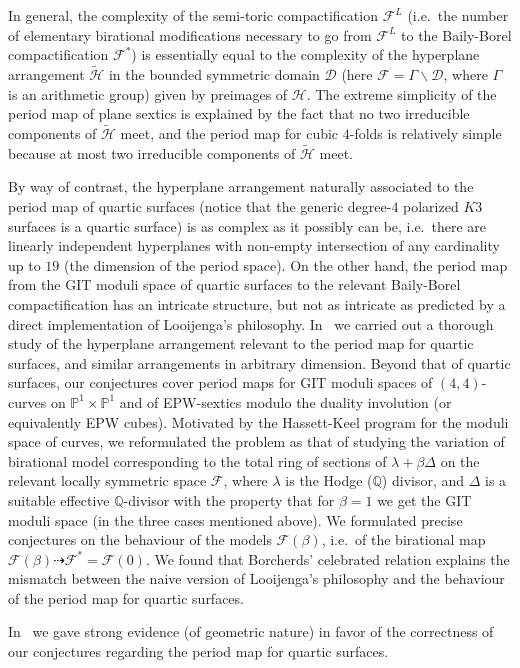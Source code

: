 \documentclass[11pt]{amsart}
\numberwithin{equation}{section}
\theoremstyle{plain}
\theoremstyle{remark}
\theoremstyle{definition}
\newcommand{\sF}{\mathscr{F}}
\newcommand{\sH}{\mathscr{H}}
\newcommand{\sD}{\mathscr{D}}
\newcommand{\dra}{\dashrightarrow}
\newcommand{\PP}{{\mathbb P}}
\newcommand{\QQ}{{\mathbb Q}}
\newcommand{\wt}{\widetilde}
\begin{document}
 In general, the complexity of the semi-toric compactification $\sF^L$ (i.e.~the number of elementary birational modifications necessary to go from
  $\sF^{L}$ to the Baily-Borel compactification $\sF^{*}$) is essentially equal to the complexity of the  hyperplane arrangement $\wt{\sH}$ in the bounded symmetric domain $\sD$ (here $\sF=\Gamma\backslash\sD$, where $\Gamma$ is an arithmetic group)   given by preimages of $\sH$. The extreme simplicity of the period map of plane sextics is explained by the fact that no two irreducible components of $\wt{\sH}$ meet, and the period map for cubic $4$-folds is relatively simple because  at most two irreducible components of $\wt{\sH}$ meet. 
 
 By way of contrast, the hyperplane arrangement  naturally associated to the period map  of quartic surfaces (notice that the generic degree-$4$ polarized $K3$ surfaces is a quartic surface) is as complex as it possibly can be, i.e.~there are linearly independent hyperplanes with non-empty intersection of any cardinality up to $19$ (the dimension of the period space).
On the other hand, the period map from the GIT moduli space of quartic surfaces  to the relevant Baily-Borel compactification has an intricate structure, but not as intricate as predicted by a direct implementation of Looijenga's philosophy.
In~\cite{log1} we carried out a thorough study of the hyperplane arrangement relevant to the period map for quartic surfaces, and similar arrangements in arbitrary dimension. Beyond that of quartic surfaces, our conjectures cover period maps for GIT moduli spaces  of $(4,4)$-curves on $\PP^1\times\PP^1$ and of EPW-sextics modulo the duality involution (or equivalently EPW cubes). Motivated by the Hassett-Keel program for the moduli space of curves, we reformulated the problem as   that of studying the variation of birational model corresponding to the total ring of sections of $\lambda+\beta\Delta$ on the relevant locally symmetric space $\sF$, where $\lambda$ is the Hodge ($\QQ$) divisor, and $\Delta$ is a suitable effective $\QQ$-divisor with the property that for $\beta=1$ we get the GIT moduli space (in the three cases mentioned above). We formulated precise conjectures on the behaviour of the models $\sF(\beta)$, i.e.~of the birational map 
$\sF(\beta)\dra\sF^{*}=\sF(0)$. We found that Borcherds' celebrated relation explains the mismatch between the naive version of Looijenga's philosophy and the behaviour of the period map for quartic surfaces. 

In~\cite{log2} we gave strong evidence (of geometric nature) in favor of the correctness of our conjectures regarding the period map for quartic surfaces. 
\end{document}
